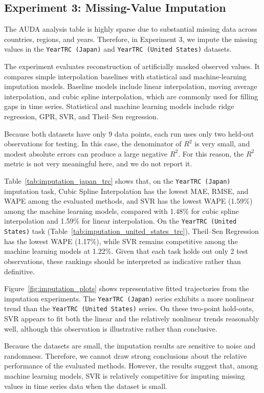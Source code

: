 \subsection{Experiment 3: Missing-Value Imputation}

The AUDA analysis table is highly sparse due to substantial missing data across countries, regions, and years. Therefore, in Experiment 3, we impute the missing values in the \texttt{YearTRC (Japan)} and \texttt{YearTRC (United States)} datasets.

The experiment evaluates reconstruction of artificially masked observed values. It compares simple interpolation baselines with statistical and machine-learning imputation models. Baseline models include linear interpolation, moving average interpolation, and cubic spline interpolation, which are commonly used for filling gaps in time series. Statistical and machine learning models include ridge regression, GPR, SVR, and Theil--Sen regression.

Because both datasets have only 9 data points, each run uses only two held-out observations for testing. In this case, the denominator of \(R^2\) is very small, and modest absolute errors can produce a large negative \(R^2\). For this reason, the \(R^2\) metric is not very meaningful here, and we do not report it.





Table~\ref{tab:imputation_japan_trc} shows that, on the \texttt{YearTRC (Japan)} imputation task, Cubic Spline Interpolation has the lowest MAE, RMSE, and WAPE among the evaluated methods, and SVR has the lowest WAPE (1.59\%) among the machine learning models, compared with 1.48\% for cubic spline interpolation and 1.59\% for linear interpolation. On the \texttt{YearTRC (United States)} task (Table~\ref{tab:imputation_united_states_trc}), Theil--Sen Regression has the lowest WAPE (1.17\%), while SVR remains competitive among the machine learning models at 1.22\%. Given that each task holds out only 2 test observations, these rankings should be interpreted as indicative rather than definitive.

Figure~\ref{fig:imputation_plots} shows representative fitted trajectories from the imputation experiments. The \texttt{YearTRC (Japan)} series exhibits a more nonlinear trend than the \texttt{YearTRC (United States)} series. On these two-point hold-outs, SVR appears to fit both the linear and the relatively nonlinear trends reasonably well, although this observation is illustrative rather than conclusive.

Because the datasets are small, the imputation results are sensitive to noise and randomness. Therefore, we cannot draw strong conclusions about the relative performance of the evaluated methods. However, the results suggest that, among machine learning models, SVR is relatively competitive for imputing missing values in time series data when the dataset is small.
